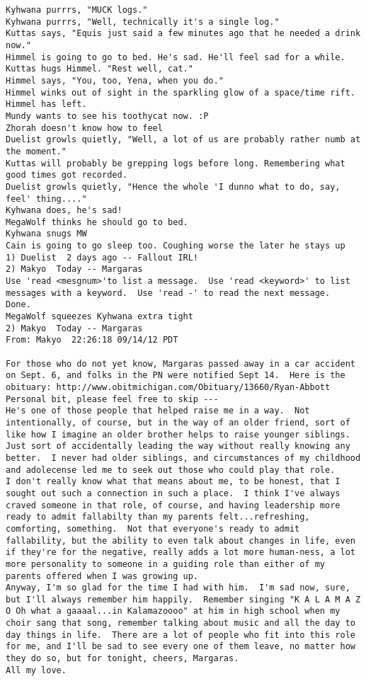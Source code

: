 \begin{verbatim}
Kyhwana purrrs, "MUCK logs."
Kyhwana purrrs, "Well, technically it's a single log."
Kuttas says, "Equis just said a few minutes ago that he needed a drink now."
Himmel is going to go to bed. He's sad. He'll feel sad for a while.
Kuttas hugs Himmel. "Rest well, cat."
Himmel says, "You, too, Yena, when you do."
Himmel winks out of sight in the sparkling glow of a space/time rift.
Himmel has left.
Mundy wants to see his toothycat now. :P
Zhorah doesn't know how to feel
Duelist growls quietly, "Well, a lot of us are probably rather numb at the moment."
Kuttas will probably be grepping logs before long. Remembering what good times got recorded.
Duelist growls quietly, "Hence the whole 'I dunno what to do, say, feel' thing...."
Kyhwana does, he's sad!
MegaWolf thinks he should go to bed.
Kyhwana snugs MW
Cain is going to go sleep too. Coughing worse the later he stays up
1) Duelist  2 days ago -- Fallout IRL!
2) Makyo  Today -- Margaras
Use 'read <mesgnum>'to list a message.  Use 'read <keyword>' to list
messages with a keyword.  Use 'read -' to read the next message.
Done.
MegaWolf squeezes Kyhwana extra tight
2) Makyo  Today -- Margaras
From: Makyo  22:26:18 09/14/12 PDT

For those who do not yet know, Margaras passed away in a car accident on Sept. 6, and folks in the PN were notified Sept 14.  Here is the obituary: http://www.obitmichigan.com/Obituary/13660/Ryan-Abbott
Personal bit, please feel free to skip ---
He's one of those people that helped raise me in a way.  Not intentionally, of course, but in the way of an older friend, sort of like how I imagine an older brother helps to raise younger siblings.  Just sort of accidentally leading the way without really knowing any better.  I never had older siblings, and circumstances of my childhood and adolecense led me to seek out those who could play that role.
I don't really know what that means about me, to be honest, that I sought out such a connection in such a place.  I think I've always craved someone in that role, of course, and having leadership more ready to admit fallabilty than my parents felt...refreshing, comforting, something.  Not that everyone's ready to admit fallability, but the ability to even talk about changes in life, even if they're for the negative, really adds a lot more human-ness, a lot more personality to someone in a guiding role than either of my parents offered when I was growing up.
Anyway, I'm so glad for the time I had with him.  I'm sad now, sure, but I'll always remember him happily.  Remember singing "K A L A M A Z O Oh what a gaaaal...in Kalamazoooo" at him in high school when my choir sang that song, remember talking about music and all the day to day things in life.  There are a lot of people who fit into this role for me, and I'll be sad to see every one of them leave, no matter how they do so, but for tonight, cheers, Margaras.
All my love.


\end{verbatim}
